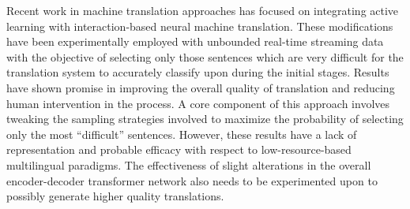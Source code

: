 Recent work in machine translation approaches has focused on integrating active learning
with interaction-based neural machine translation. These modifications have been experimentally 
employed with unbounded real-time streaming data \cite{peris2020active} with the objective of selecting 
only those sentences which are very difficult for the translation system to accurately classify upon 
during the initial stages. Results have shown promise in improving the overall quality of translation 
and reducing human intervention in the process. A core component of this approach involves tweaking the 
sampling strategies involved to maximize the probability of selecting only the most “difficult” sentences. 
However, these results have a lack of representation and probable efficacy with respect to low-resource-based 
multilingual paradigms. The effectiveness of slight alterations in the overall encoder-decoder transformer 
network also needs to be experimented upon to possibly generate higher quality translations. 

